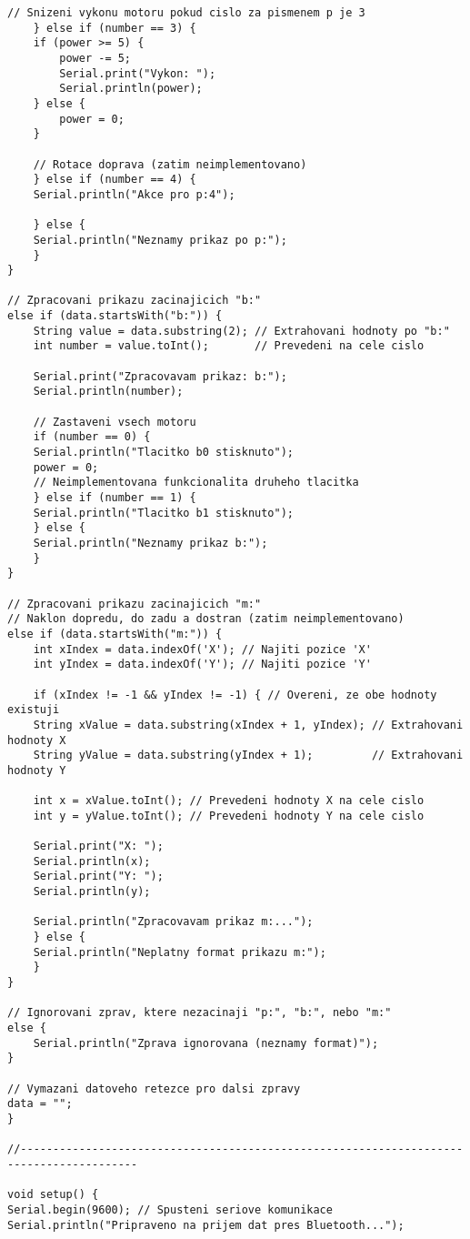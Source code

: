 \documentclass[12pt]{report}
\begin{document}
\begin{appendices}
\begin{lstlisting}[title={}, caption={}, label={}, basicstyle=\footnotesize\ttfamily, inputencoding=utf8]
	// Snizeni vykonu motoru pokud cislo za pismenem p je 3
	} else if (number == 3) {
	if (power >= 5) {
		power -= 5;
		Serial.print("Vykon: ");
		Serial.println(power);
	} else {
		power = 0;
	}

	// Rotace doprava (zatim neimplementovano)
	} else if (number == 4) {
	Serial.println("Akce pro p:4");

	} else {
	Serial.println("Neznamy prikaz po p:");
	}
}

// Zpracovani prikazu zacinajicich "b:"
else if (data.startsWith("b:")) {
	String value = data.substring(2); // Extrahovani hodnoty po "b:"
	int number = value.toInt();       // Prevedeni na cele cislo

	Serial.print("Zpracovavam prikaz: b:");
	Serial.println(number);

	// Zastaveni vsech motoru
	if (number == 0) {
	Serial.println("Tlacitko b0 stisknuto");
	power = 0;
	// Neimplementovana funkcionalita druheho tlacitka
	} else if (number == 1) {
	Serial.println("Tlacitko b1 stisknuto");
	} else {
	Serial.println("Neznamy prikaz b:");
	}
}

// Zpracovani prikazu zacinajicich "m:"
// Naklon dopredu, do zadu a dostran (zatim neimplementovano)
else if (data.startsWith("m:")) {
	int xIndex = data.indexOf('X'); // Najiti pozice 'X'
	int yIndex = data.indexOf('Y'); // Najiti pozice 'Y'

	if (xIndex != -1 && yIndex != -1) { // Overeni, ze obe hodnoty existuji
	String xValue = data.substring(xIndex + 1, yIndex); // Extrahovani hodnoty X
	String yValue = data.substring(yIndex + 1);         // Extrahovani hodnoty Y

	int x = xValue.toInt(); // Prevedeni hodnoty X na cele cislo
	int y = yValue.toInt(); // Prevedeni hodnoty Y na cele cislo

	Serial.print("X: ");
	Serial.println(x);
	Serial.print("Y: ");
	Serial.println(y);

	Serial.println("Zpracovavam prikaz m:...");
	} else {
	Serial.println("Neplatny format prikazu m:");
	}
}

// Ignorovani zprav, ktere nezacinaji "p:", "b:", nebo "m:"
else {
	Serial.println("Zprava ignorovana (neznamy format)");
}

// Vymazani datoveho retezce pro dalsi zpravy
data = "";
}

//----------------------------------------------------------------------------------------

void setup() {
Serial.begin(9600); // Spusteni seriove komunikace
Serial.println("Pripraveno na prijem dat pres Bluetooth...");


\end{lstlisting}
\end{appendices}
\end{document}
